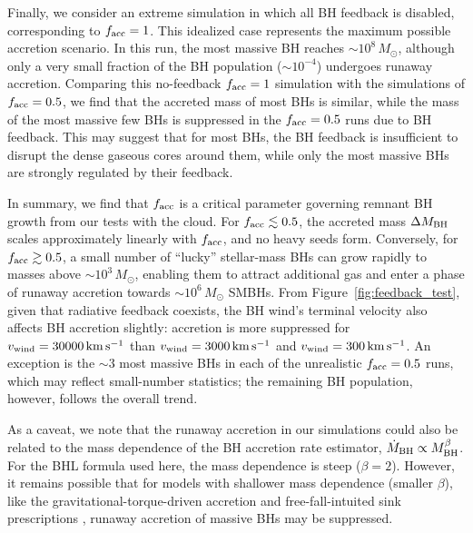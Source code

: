 \documentclass[twocolumn]{aastex631}
\begin{document}
Finally, we consider an extreme simulation in which all BH feedback is disabled, corresponding to $f_{\rm acc}=1$. This idealized case represents the maximum possible accretion scenario. In this run, the most massive BH reaches $\sim 10^8\,M_\odot$, although only a very small fraction of the BH population ($\sim 10^{-4}$) undergoes runaway accretion. {Comparing this no-feedback $f_{\rm acc}=1$ simulation with the simulations of $f_{\rm acc}=0.5$, we find that the accreted mass of most BHs is similar, while the mass of the most massive few BHs is suppressed in the $f_{\rm acc}=0.5$ runs due to BH feedback. This may suggest that for most BHs, the BH feedback is insufficient to disrupt the dense gaseous cores around them, while only the most massive BHs are strongly regulated by their feedback. 
}

In summary, we find that $f_{\rm acc}$ is a critical parameter governing remnant BH growth from our tests with the  cloud. For $f_{\rm acc}\lesssim 0.5$, the accreted mass $\Delta M_{\rm BH}$ scales approximately linearly with $f_{\rm acc}$, and no heavy seeds form. Conversely, for $f_{\rm acc}\gtrsim 0.5$, a small number of ``lucky'' stellar-mass BHs can grow rapidly to masses above $\sim 10^3\,M_\odot$, enabling them to attract additional gas and enter a phase of runaway accretion towards $\sim 10^6\,M_\odot$ SMBHs. From Figure~\ref{fig:feedback_test}, given that radiative feedback coexists, the BH wind's terminal velocity also affects BH accretion slightly: accretion is more suppressed for $v_{\rm wind}=30000\,\rm km\,s^{-1}$ than $v_{\rm wind}=3000\,\rm km\,s^{-1}$ and $v_{\rm wind}=300\,\rm km\,s^{-1}$. An exception is the $\sim 3$ most massive BHs in each of the unrealistic $f_{\rm acc}=0.5$ runs, which may reflect small-number statistics; the remaining BH population, however, follows the overall trend.

{As a caveat, we note that the runaway accretion in our simulations could also be related to the mass dependence of the BH accretion rate estimator, $\dot M_{\rm BH} \propto M_{\rm BH}^\beta$. For the BHL formula used here, the mass dependence is steep ($\beta=2$). However, it remains possible that for models with shallower mass dependence (smaller $\beta$), like the gravitational-torque-driven accretion \citep{HopkinsQuataert_2011MNRAS.415.1027H,Angles-AlcazarDaveFaucher-Giguere_2017MNRAS.464.2840A,Angles-AlcazarQuataertHopkins_2021ApJ...917...53A} and free-fall-intuited sink prescriptions \citep{WeinbergerBhowmickBlecha_2025A&A...700A..52W}, runaway accretion of massive BHs may be suppressed.
}
\end{document}

